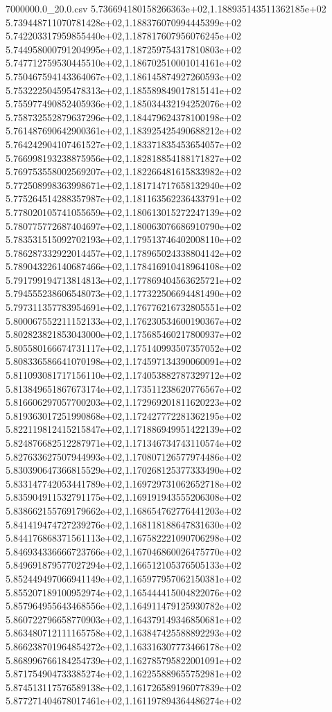 \begin{filecontents*}{7000000.0_20.0.csv}
5.736694180158266363e+02,1.188935143511362185e+02
5.739448711070781428e+02,1.188376070994445399e+02
5.742203317959855440e+02,1.187817607956076245e+02
5.744958000791204995e+02,1.187259754317810803e+02
5.747712759530445510e+02,1.186702510001014161e+02
5.750467594143364067e+02,1.186145874927260593e+02
5.753222504595478313e+02,1.185589849017815141e+02
5.755977490852405936e+02,1.185034432194252076e+02
5.758732552879637296e+02,1.184479624378100198e+02
5.761487690642900361e+02,1.183925425490688212e+02
5.764242904107461527e+02,1.183371835453654057e+02
5.766998193238875956e+02,1.182818854188171827e+02
5.769753558002569207e+02,1.182266481615833982e+02
5.772508998363998671e+02,1.181714717658132940e+02
5.775264514288357987e+02,1.181163562236433791e+02
5.778020105741055659e+02,1.180613015272247139e+02
5.780775772687404697e+02,1.180063076686910790e+02
5.783531515092702193e+02,1.179513746402008110e+02
5.786287332922014457e+02,1.178965024338804142e+02
5.789043226140687466e+02,1.178416910418964108e+02
5.791799194713814813e+02,1.177869404563625721e+02
5.794555238606548073e+02,1.177322506694481490e+02
5.797311357783954691e+02,1.176776216732805551e+02
5.800067552211152133e+02,1.176230534600190367e+02
5.802823821853043000e+02,1.175685460217800937e+02
5.805580166674731117e+02,1.175140993507357052e+02
5.808336586641070198e+02,1.174597134390060091e+02
5.811093081717156110e+02,1.174053882787329712e+02
5.813849651867673174e+02,1.173511238620776567e+02
5.816606297057700203e+02,1.172969201811620223e+02
5.819363017251990868e+02,1.172427772281362195e+02
5.822119812415215847e+02,1.171886949951422139e+02
5.824876682512287971e+02,1.171346734743110574e+02
5.827633627507944993e+02,1.170807126577974486e+02
5.830390647366815529e+02,1.170268125377333490e+02
5.833147742053441789e+02,1.169729731062652718e+02
5.835904911532791175e+02,1.169191943555206308e+02
5.838662155769179662e+02,1.168654762776441203e+02
5.841419474727239276e+02,1.168118188647831630e+02
5.844176868371561113e+02,1.167582221090706298e+02
5.846934336666723766e+02,1.167046860026475770e+02
5.849691879577027294e+02,1.166512105376505133e+02
5.852449497066941149e+02,1.165977957062150381e+02
5.855207189100952974e+02,1.165444415004822076e+02
5.857964955643468556e+02,1.164911479125930782e+02
5.860722796658770903e+02,1.164379149346850681e+02
5.863480712111165758e+02,1.163847425588892293e+02
5.866238701964854272e+02,1.163316307773466178e+02
5.868996766184254739e+02,1.162785795822001091e+02
5.871754904733385274e+02,1.162255889655752981e+02
5.874513117576589138e+02,1.161726589196077839e+02
5.877271404678017461e+02,1.161197894364486274e+02

\end{filecontents*}
